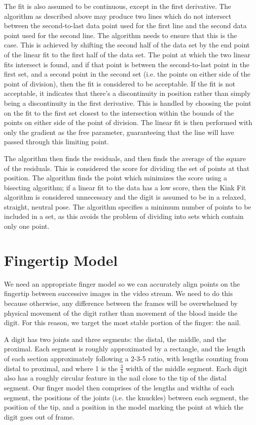 The fit is also assumed to be continuous, except in the first derivative. The algorithm as described above may produce two lines which do not intersect between the second-to-last data point used for the first line and the second data point used for the second line. The algorithm needs to ensure that this is the case. This is achieved by shifting the second half of the data set by the end point of the linear fit to the first half of the data set. The point at which the two linear fits intersect is found, and if that point is between the second-to-last point in the first set, and a second point in the second set (i.e. the points on either side of the point of division), then the fit is considered to be acceptable. If the fit is not acceptable, it indicates that there's a discontinuity in position rather than simply being a discontinuity in the first derivative. This is handled by choosing the point on the fit to the first set closest to the intersection within the bounds of the points on either side of the point of division. The linear fit is then performed with only the gradient as the free parameter, guaranteeing that the line will have passed through this limiting point.

The algorithm then finds the residuals, and then finds the average of the square of the residuals. This is considered the score for dividing the set of points at that position. The algorithm finds the point which minimizes the score using a bisecting algorithm; if a linear fit to the data has a low score, then the Kink Fit algorithm is considered unnecessary and the digit is assumed to be in a relaxed, straight, neutral pose. The algorithm specifies a minimum number of points to be included in a set, as this avoids the problem of dividing into sets which contain only one point.

\section{Fingertip Model}\label{sec:FingertipModel}

We need an appropriate finger model so we can accurately align points on the fingertip between successive images in the video stream. We need to do this because otherwise, any difference between the frames will be overwhelmed by physical movement of the digit rather than movement of the blood inside the digit. For this reason, we target the most stable portion of the finger: the nail.

A digit has two joints and three segments: the distal, the middle, and the proximal. Each segment is roughly approximated by a rectangle, and the length of each section approximately following a 2-3-5 ratio, with lengths counting from distal to proximal, and where 1 is the $\frac{3}{4}$ width of the middle segment. Each digit also has a roughly circular feature in the nail close to the tip of the distal segment. Our finger model then comprises of the lengths and widths of each segment, the positions of the joints (i.e. the knuckles) between each segment, the position of the tip, and a position in the model marking the point at which the digit goes out of frame. 

